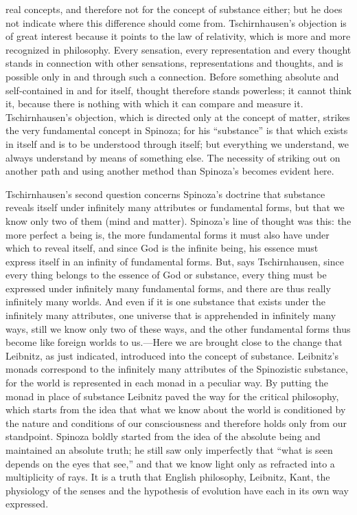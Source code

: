 \documentclass[12pt]{book}
\newcommand{\opage}[1]{\marginnote{\footnotesize\textit{[#1]}}}
\begin{document}
real concepts, and therefore not for the concept of substance either; but he does not
indicate where this difference should \opage{70}come from. Tschirnhausen's objection is
of great interest because it points to the law of relativity, which is more and more
recognized in philosophy. Every sensation, every representation and every thought
stands in connection with other sensations, representations and thoughts, and is
possible only in and through such a connection. Before something absolute and
self-contained in and for itself, thought therefore stands powerless; it cannot think
it, because there is nothing with which it can compare and measure it. Tschirnhausen's
objection, which is directed only at the concept of matter, strikes the very
fundamental concept in Spinoza; for his ``substance'' is that which exists in itself
and is to be understood through itself; but everything we understand, we always
understand by means of something else. The necessity of striking out on another path
and using another method than Spinoza's becomes evident here.

Tschirnhausen's second question concerns Spinoza's doctrine that substance reveals
itself under infinitely many attributes or fundamental forms, but that we know only two
of them (mind and matter). Spinoza's line of thought was this: the more perfect a being
is, the more fundamental forms it must also have under which to reveal itself, and
since God is the infinite being, his essence must express itself in an infinity of
fundamental forms. But, says Tschirnhausen, since every thing belongs to the essence of
God or substance, every thing must be expressed under infinitely many fundamental
forms, and there are thus really infinitely many worlds. And even if it is one
substance that exists under the infinitely many attributes, one universe \opage{71}that
is apprehended in infinitely many ways, still we know only two of these ways, and the
other fundamental forms thus become like foreign worlds to us.---Here we are brought
close to the change that Leibnitz, as just indicated, introduced into the concept of
substance. Leibnitz's monads correspond to the infinitely many attributes of the
Spinozistic substance, for the world is represented in each monad in a peculiar way.
By putting the monad in place of substance Leibnitz paved the way for the critical
philosophy, which starts from the idea that what we know about the world is conditioned
by the nature and conditions of our consciousness and therefore holds only from our
standpoint. Spinoza boldly started from the idea of the absolute being and maintained
an absolute truth; he still saw only imperfectly that ``what is seen depends on the
eyes that see,'' and that we know light only as refracted into a multiplicity of rays.
It is a truth that English philosophy, Leibnitz, Kant, the physiology of the senses
and the hypothesis of evolution have each in its own way expressed.
\end{document}
